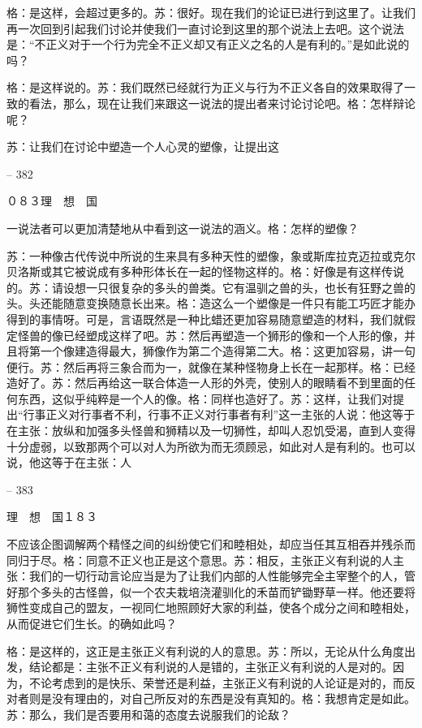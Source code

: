 \documentclass[11pt,oneside]{book}
\begin{document}
\begin{common-format}
    格：是这样，会超过更多的。苏：很好。现在我们的论证已进行到这里了。让我们再一次回到引起我们讨论并使我们一直讨论到这里的那个说法上去吧。这个说法是：“不正义对于一个行为完全不正义却又有正义之名的人是有利的。”是如此说的吗？

    格：是这样说的。苏：我们既然已经就行为正义与行为不正义各自的效果取得了一致的看法，那么，现在让我们来跟这一说法的提出者来讨论讨论吧。格：怎样辩论呢？

    苏：让我们在讨论中塑造一个人心灵的塑像，让提出这

    

-- 382

    ０８３理　想　国

    一说法者可以更加清楚地从中看到这一说法的涵义。格：怎样的塑像？

    苏：一种像古代传说中所说的生来具有多种天性的塑像，象或斯库拉克迈拉或克尔贝洛斯或其它被说成有多种形体长在一起的怪物这样的。格：好像是有这样传说的。苏：请设想一只很复杂的多头的兽类。它有温驯之兽的头，也长有狂野之兽的头。头还能随意变换随意长出来。格：造这么一个塑像是一件只有能工巧匠才能办得到的事情呀。可是，言语既然是一种比蜡还更加容易随意塑造的材料，我们就假定怪兽的像已经塑成这样了吧。苏：然后再塑造一个狮形的像和一个人形的像，并且将第一个像建造得最大，狮像作为第二个造得第二大。格：这更加容易，讲一句便行。苏：然后再将三象合而为一，就像在某种怪物身上长在一起那样。格：已经造好了。苏：然后再给这一联合体造一人形的外壳，使别人的眼睛看不到里面的任何东西，这似乎纯粹是一个人的像。格：同样也造好了。苏：这样，让我们对提出“行事正义对行事者不利，行事不正义对行事者有利”这一主张的人说：他这等于在主张：放纵和加强多头怪兽和狮精以及一切狮性，却叫人忍饥受渴，直到人变得十分虚弱，以致那两个可以对人为所欲为而无须顾忌，如此对人是有利的。也可以说，他这等于在主张：人

    

-- 383

    理　想　国１８３

    不应该企图调解两个精怪之间的纠纷使它们和睦相处，却应当任其互相吞并残杀而同归于尽。格：同意不正义也正是这个意思。苏：相反，主张正义有利说的人主张：我们的一切行动言论应当是为了让我们内部的人性能够完全主宰整个的人，管好那个多头的古怪兽，似一个农夫栽培浇灌驯化的禾苗而铲锄野草一样。他还要将狮性变成自己的盟友，一视同仁地照顾好大家的利益，使各个成分之间和睦相处，从而促进它们生长。的确如此吗？

    格：是这样的，这正是主张正义有利说的人的意思。苏：所以，无论从什么角度出发，结论都是：主张不正义有利说的人是错的，主张正义有利说的人是对的。因为，不论考虑到的是快乐、荣誉还是利益，主张正义有利说的人论证是对的，而反对者则是没有理由的，对自己所反对的东西是没有真知的。格：我想肯定是如此。苏：那么，我们是否要用和蔼的态度去说服我们的论敌？


\end{common-format}
\end{document}
